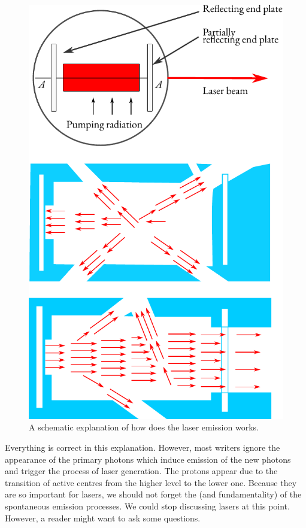 \begin{figure}[!ht]
\centering
\includegraphics[width=0.75\tfwidth]{figures/laser.pdf}
\caption{ A schematic explanation of how does the laser emission works.
\label{laser}}
\end{figure}

Everything is correct in this explanation. However, most writers
ignore the appearance of the primary photons which induce emission of
the new photons and trigger the process of laser generation. The protons
appear due to the  transition of active centres from the
higher level to the lower one. Because they are so important for lasers,
we should not forget the  (and fundamentality) of the
spontaneous emission processes. We could stop discussing lasers at this
point. However, a reader might want to ask some questions.

